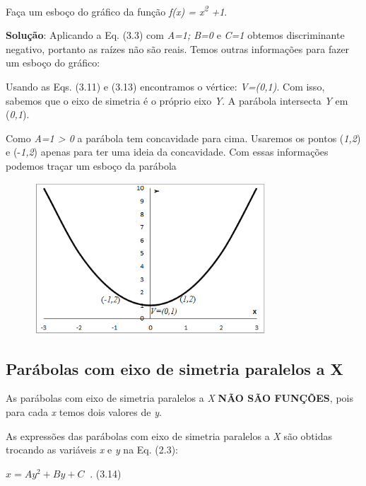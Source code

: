 \begin{texemplo}
Faça um esboço do gráfico da função \textit{f(x) = x\textsuperscript{2} +1}. 

\textbf{Solução}: Aplicando a Eq. (3.3) com \textit{A=1; B=0 }e\textit{ C=1 } obtemos discriminante negativo, portanto as raízes não são reais. Temos outras informações para fazer um esboço do gráfico:

Usando as Eqs. (3.11) e (3.13) encontramos o vértice: \textit{V=(0,1)}. Com isso, sabemos que o eixo de simetria é o próprio eixo \textit{Y}. A parábola intersecta \textit{Y} em (\textit{0,1}).

Como \textit{A=1 > 0} a parábola tem concavidade para cima. Usaremos os pontos (\textit{1,2}) e (-\textit{1,2}) apenas para ter uma ideia da concavidade. Com essas informações podemos traçar um esboço da parábola\qedsymbol{}

\begin{figure}[H]
	\begin{Center}
		\includegraphics[width=3.44in,height=2.23in]{capitulos/funcao_do_segundo_grau/media/image9.png}
	\end{Center}
\end{figure}
\end{texemplo}

\subsection{Parábolas com eixo de simetria paralelos a X}

As parábolas com eixo de simetria paralelos a \textit{X}   \textbf{NÃO SÃO FUNÇÕES}, pois para cada \textit{x} temos dois valores de \textit{y}.

As expressões das parábolas com eixo de simetria paralelos a \textit{X} são obtidas trocando as variáveis \textit{x} e \textit{y} na Eq. (2.3):

 \( x=Ay^{2}+By+C_{~ } \) . \tab (3.14)

